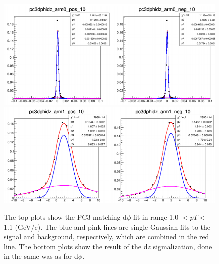 \begin{figure}[h!]
\begin{center}
\includegraphics[scale=0.45]{figs/pc3dphi.png}
\includegraphics[scale=0.45]{figs/pc3dz.png}
\end{center}
\label{fig:pc3_sig}
\caption{The top plots show the PC3 matching d$\phi$ fit in range 1.0 $< pT <$ 1.1 (GeV/c).
The blue and pink lines are single Gaussian fits to the signal and background, respectively, which are combined in the red line.
The bottom plots show the result of the d$z$ sigmalization, done in the same was as for d$\phi$.}
\end{figure}


